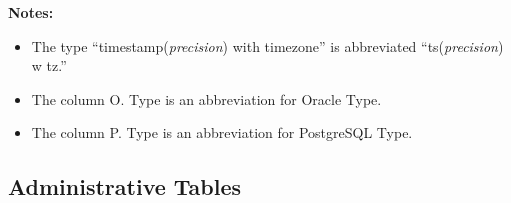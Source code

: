 \newcommand{\cd}{{C}ondor}
\newcommand{\qp}{{Q}uill}
\newcommand{\ca}{{C}lass{A}d}
\newcommand{\cas}{{C}lass{A}ds}
\newcommand{\pg}{{P}ostgre{SQL}}
\newcommand{\oc}{{O}racle}
\newcommand{\db}{{D}bmsd}

\noindent \textbf{Notes:}
\begin{itemize}
\item The type ``timestamp(\textit{precision}) with timezone'' is
abbreviated ``ts(\textit{precision}) w tz.''
\item The column O. Type is an abbreviation for Oracle Type.
\item The column P. Type is an abbreviation for {PostgreSQL} Type.
\end{itemize}
\vspace{24pt}

\subsection{Administrative Tables}
